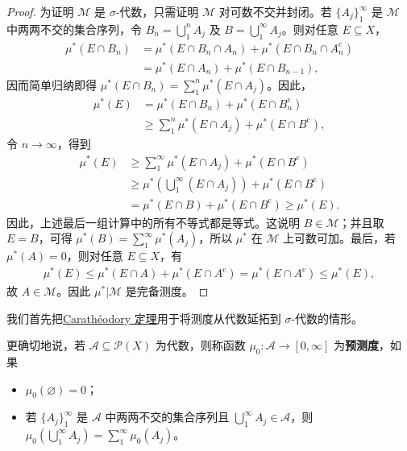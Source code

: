 \documentclass[../../main.tex]{subfiles}%
\begin{document}
\begin{proof}
为证明 $\mathscr{M}$ 是 $\sigma$-代数，只需证明 $\mathscr{M}$ 对可数不交并封闭。若 $\{A_j\}_1^\infty$ 是 $\mathscr{M}$ 中两两不交的集合序列，令 $B_n=\bigcup_1^n A_j$ 及 $B=\bigcup_1^\infty A_j$。则对任意 $E\subseteq X$，
\begin{align*}
\mu^*(E\cap B_n)&=\mu^*(E\cap B_n\cap A_n)+\mu^*(E\cap B_n\cap A_n^{\mathrm{c}})\\
&=\mu^*(E\cap A_n)+\mu^*(E\cap B_{n-1}),
\end{align*}
因而简单归纳即得 $\mu^*(E\cap B_n)=\sum_1^n\mu^*(E\cap A_j)$。因此，
\begin{align*}
\mu^*(E)&=\mu^*(E\cap B_n)+\mu^*(E\cap B_n^{\mathrm{c}})\\
&\geqslant\sum_1^n\mu^*(E\cap A_j)+\mu^*(E\cap B^{\mathrm{c}}),
\end{align*}
令 $n\to\infty$，得到
\begin{align*}
\mu^*(E)&\geqslant\sum_1^\infty\mu^*(E\cap A_j)+\mu^*(E\cap B^{\mathrm{c}})\\
&\geqslant\mu^*\left(\bigcup_1^\infty(E\cap A_j)\right)+\mu^*(E\cap B^{\mathrm{c}})\\
&=\mu^*(E\cap B)+\mu^*(E\cap B^{\mathrm{c}})\geqslant\mu^*(E).
\end{align*}
因此，上述最后一组计算中的所有不等式都是等式。这说明 $B\in\mathscr{M}$；并且取 $E=B$，可得 $\mu^*(B)=\sum_1^\infty\mu^*(A_j)$，所以 $\mu^*$ 在 $\mathscr{M}$ 上可数可加。最后，若 $\mu^*(A)=0$，则对任意 $E\subseteq X$，有
\begin{align*}
\mu^*(E)\leqslant\mu^*(E\cap A)+\mu^*(E\cap A^{\mathrm{c}})=\mu^*(E\cap A^{\mathrm{c}})\leqslant\mu^*(E),
\end{align*}
故 $A\in\mathscr{M}$。因此 $\mu^*|\mathscr{M}$ 是完备测度。
\end{proof}

我们首先把\hyperref[theorem:ch01-caratheodory]{Carathéodory 定理}用于将测度从代数延拓到 $\sigma$-代数的情形。
\begin{definition}[预测度]\label{definition:ch01-premeasure-definition}
更确切地说，若 $\mathscr{A}\subseteq\mathscr{P}(X)$ 为代数，则称函数 $\mu_0:\mathscr{A}\to[0,\infty]$ 为\textbf{预测度}，如果
\begin{itemize}
\item $\mu_0(\varnothing)=0$；
\item 若 $\{A_j\}_1^\infty$ 是 $\mathscr{A}$ 中两两不交的集合序列且 $\bigcup_1^\infty A_j\in\mathscr{A}$，则 $\mu_0(\bigcup_1^\infty A_j)=\sum_1^\infty\mu_0(A_j)$。
\end{itemize}
\end{definition}
\end{document}
